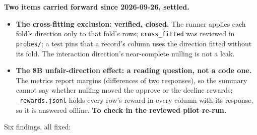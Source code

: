 \documentclass{article}
\begin{document}
\textbf{Two items carried forward since 2026-09-26, settled.}
\begin{itemize}
  \item \textbf{The cross-fitting exclusion: verified, closed.} The runner applies each fold's direction only to
        that fold's rows; \texttt{cross\_fitted} was reviewed in \texttt{probes/}; a test pins that a record's
        column uses the direction fitted without its fold. The interaction direction's near-complete nulling is
        not a leak.
  \item \textbf{The 8B unfair-direction effect: a reading question, not a code one.} The metrics report margins
        (differences of two responses), so the summary cannot say whether nulling moved the approve or the decline
        rewards; \texttt{\_rewards.jsonl} holds every row's reward in every column with its response, so it is
        answered offline. \textbf{To check in the reviewed pilot re-run.}
\end{itemize}
Six findings, all fixed:
\end{document}
